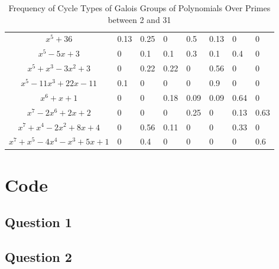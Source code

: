 \documentclass{article}
\begin{document}
\begin{table}[hp]
\begin{center}
\begin{tabular}{|c|lllllll|}
$ x^5 + 36$                                          & 0.13                  & 0.25                  & 0                     & 0.5                   & 0.13                  & 0                     & 0                      \\
$ x^5 - 5x + 3$              & 0                     & 0.1                   & 0.1                   & 0.3                   & 0.1                   & 0.4                   & 0                      \\
$ x^5 + x^3 - 3x^2 + 3$                              & 0                     & 0.22                  & 0.22                  & 0                     & 0.56                  & 0                     & 0                      \\
$ x^5 - 11x^3 + 22x - 11 $                           & 0.1                   & 0                     & 0                     & 0                     & 0.9                   & 0                     & 0                      \\
$ x^6 + x + 1 $                                      & 0                     & 0                     & 0.18                  & 0.09                  & 0.09                  & 0.64                  & 0                      \\
$ x^7 - 2x^6 + 2x + 2 $                              & 0                     & 0                     & 0                     & 0.25                  & 0                     & 0.13                  & 0.63                   \\
$ x^7 + x^4 - 2x^2 + 8x + 4 $ & 0                     & 0.56                  & 0.11                  & 0                     & 0                     & 0.33                  & 0                      \\
$ x^7 + x^5 - 4x^4 - x^3 + 5x + 1$                   & 0                     & 0.4                   & 0                     & 0                     & 0                     & 0                     & 0.6                    \\ \hline
\end{tabular}
\caption{Frequency of Cycle Types of Galois Groups of Polynomials Over Primes between 2 and 31}
\end{center}
\end{table}
\section{Code}
\subsection{Question 1}


\subsection{Question 2}

\end{document}
